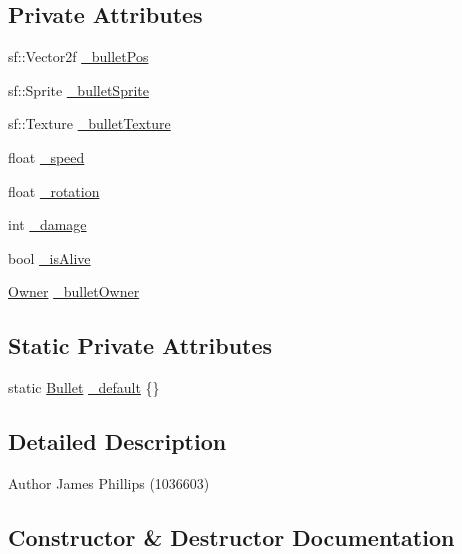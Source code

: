 \subsection*{Private Attributes}
\begin{DoxyCompactItemize}
\item 
sf\+::\+Vector2f \hyperlink{class_bullet_a5889ed15f47debd2914c39f2dc71ec35}{\+\_\+bullet\+Pos}
\item 
sf\+::\+Sprite \hyperlink{class_bullet_a02a711293bc8bb2e8c7107811071c2e3}{\+\_\+bullet\+Sprite}
\item 
sf\+::\+Texture \hyperlink{class_bullet_ab75a648ee856f991a724499d1b8756fc}{\+\_\+bullet\+Texture}
\item 
float \hyperlink{class_bullet_a6a971a89bb69a7e9d5be0955e78d12a5}{\+\_\+speed}
\item 
float \hyperlink{class_bullet_a1904e460221accb69ae194fc4eb7d54f}{\+\_\+rotation}
\item 
int \hyperlink{class_bullet_a9b7eeafe7ca0e007f22e88ed39c04f34}{\+\_\+damage}
\item 
bool \hyperlink{class_bullet_a493d2187e18321e4777e3681c5ee07a6}{\+\_\+is\+Alive}
\item 
\hyperlink{_bullet_8h_a3b5e9e55eb7b08d5702a101e529e5507}{Owner} \hyperlink{class_bullet_af9fd5bbfc7e4e6a5a0f7e5af45360309}{\+\_\+bullet\+Owner}
\end{DoxyCompactItemize}
\subsection*{Static Private Attributes}
\begin{DoxyCompactItemize}
\item 
static \hyperlink{class_bullet}{Bullet} \hyperlink{class_bullet_a3a4b2ab27b25f04a30d3fc39e4a3b014}{\+\_\+default} \{\}
\end{DoxyCompactItemize}


\subsection{Detailed Description}
\begin{DoxyAuthor}{Author}
James Phillips (1036603) 
\end{DoxyAuthor}


\subsection{Constructor \& Destructor Documentation}
\mbox{\label{class_bullet_a751da85d043013c509426b6cf33bd9c5}} 
